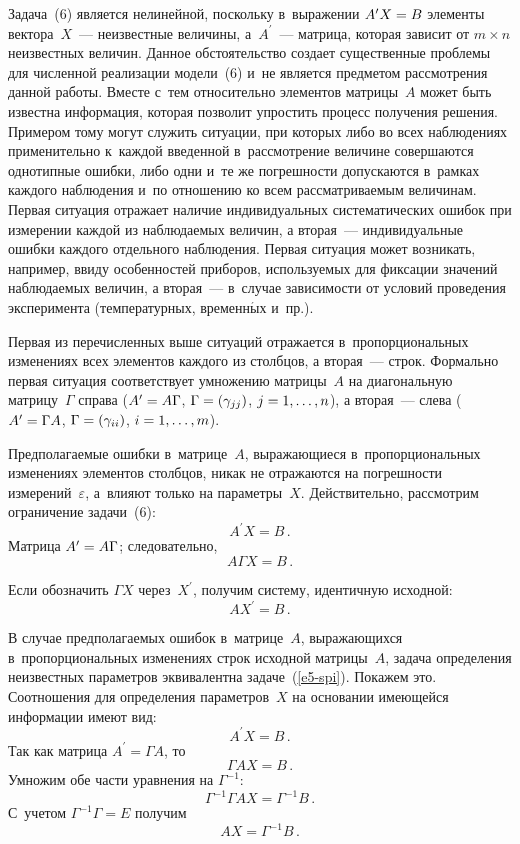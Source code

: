 \begin{multicols}{2}
  Задача~(6) является нелинейной, поскольку в~выражении $A^\prime X\hm=
B$ элементы вектора~$X$~--- неизвестные величины, а~$A^\prime$~---
матрица, которая зависит от $m\times n$ неизвестных величин. Данное
обстоятельство создает существенные проблемы для численной реализации
модели~(6) и~не является предметом рассмотрения данной работы. Вместе с~тем
относительно элементов матрицы~$A$ может быть известна информация,
которая позволит упростить процесс получения решения. Примером тому могут
служить ситуации, при которых либо во всех наблюдениях применительно
к~каж\-дой введенной в~рассмотрение величине совершаются однотипные ошибки,
либо одни и~те же погрешности допускаются в~рамках каж\-до\-го наблюдения и~по отношению ко всем рассматриваемым величинам. Первая ситуация отражает
наличие индивидуальных систематических ошибок при измерении каж\-дой из
наблюдаемых величин, а вторая~--- индивидуальные ошибки каж\-до\-го
отдельного наблюдения. Первая ситуация может возникать, например, ввиду
особенностей приборов, используемых для фиксации значений наблюдаемых
величин, а вторая~--- в~случае зависимости от условий проведения
эксперимента (температурных, временн$\acute{\mbox{ы}}$х и~пр.).

  Первая из перечисленных выше ситуаций отражается в~пропорциональных
изменениях всех элементов каждого из столбцов, а вторая~--- строк. Формально
первая ситуация соответствует умножению матрицы~$A$ на диагональную
матрицу~$\Gamma$ справа ($A^\prime \hm= A\Gamma$, $\Gamma\hm=
(\gamma_{jj})$, $j\hm= 1, \ldots, n$), а вторая~--- слева ($A^\prime \hm= \Gamma
A$, $\Gamma\hm= (\gamma_{ii})$, $i\hm= 1, \ldots ,m$).

  Предполагаемые ошибки в~матрице~$A$, выражающиеся в~пропорциональных изменениях элементов столбцов, никак не отражаются на
погрешности измерений~$\varepsilon$, а~влияют только на параметры~$X$.
Действительно, рассмотрим ограничение задачи~(6):
  $$
  A^\prime X= B\,.
  $$
  Матрица $A^\prime \hm= A\Gamma$; следовательно,
  $$
  A\Gamma X =B\,.
  $$

  Если обозначить $\Gamma X$ через~$X^\prime$, получим систему,
идентичную исходной:
  $$
  AX^\prime =B\,.
  $$

  В случае предполагаемых ошибок в~матрице~$A$, выражающихся в~пропорциональных изменениях строк исходной матрицы~$A$, задача
определения неизвестных параметров эквивалентна задаче~(\ref{e5-spi}).
Покажем это. Соотношения для определения параметров~$X$ на основании
имеющейся информации имеют вид:
  $$
  A^\prime X=B\,.
  $$
  Так как матрица  $A^\prime = \Gamma A$, то
  $$
  \Gamma AX =B\,.
  $$
  Умножим обе части уравнения на $\Gamma^{-1}$:
  $$
  \Gamma^{-1} \Gamma AX = \Gamma^{-1} B\,.
  $$
  С~учетом $\Gamma^{-1}\Gamma ={E}$ получим
  $$
  AX=\Gamma^{-1} B\,.
  $$


\end{multicols}
